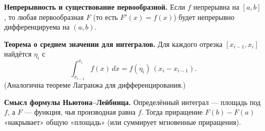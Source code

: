 
\textbf{Непрерывность и существование первообразной.}
Если $f$ непрерывна на $[a,b]$, то любая первообразная $F$ (то есть $F'(x)=f(x)$) будет непрерывно дифференцируема на $(a,b)$.

\medskip

\textbf{Теорема о среднем значении для интегралов.}
Для каждого отрезка $[x_{i-1},x_i]$ найдётся $\eta_i$ с 
\[
\int_{x_{i-1}}^{x_i} f(x)\,dx = f(\eta_i)\,(x_i - x_{i-1}).
\]
(Аналогична теореме Лагранжа для дифференцирования.)

\medskip

\textbf{Смысл формулы Ньютона–Лейбница.}
Определённый интеграл — площадь под $f$, а $F$ — функция, чья производная равна $f$. Тогда приращение $F(b)-F(a)$ «накрывает» общую «площадь» (или суммирует мгновенные приращения).
